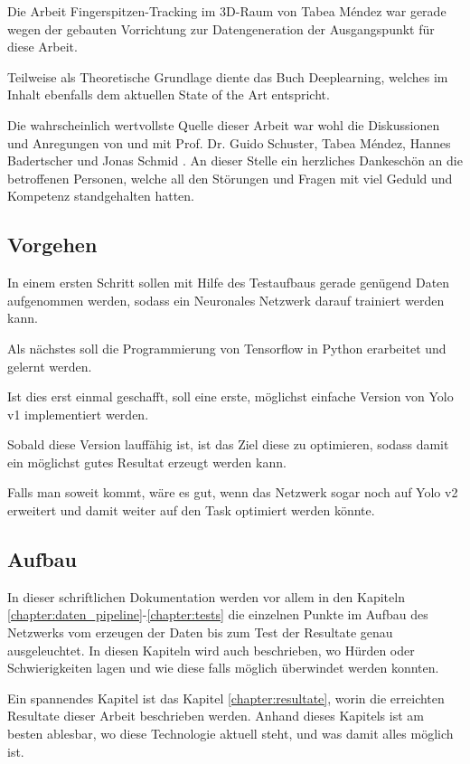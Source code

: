 Die Arbeit \grqq{}Fingerspitzen-Tracking im 3D-Raum\grqq{} von Tabea Méndez \cite{TabeasFingertracking} war gerade wegen der gebauten Vorrichtung zur Datengeneration der Ausgangspunkt für diese Arbeit.

Teilweise als Theoretische Grundlage diente das Buch Deeplearning\cite{deeplearning}, welches im Inhalt ebenfalls dem aktuellen State of the Art entspricht.

Die wahrscheinlich wertvollste Quelle dieser Arbeit war wohl die Diskussionen und Anregungen von und mit Prof. Dr. Guido Schuster, Tabea Méndez, Hannes Badertscher und Jonas Schmid \cite{PrivateCommunication}. An dieser Stelle ein herzliches Dankeschön an die betroffenen Personen, welche all den Störungen und Fragen mit viel Geduld und Kompetenz standgehalten hatten. 

\subsection{Vorgehen}
\label{chapter:vorgehen}
In einem ersten Schritt sollen mit Hilfe des Testaufbaus\cite{TabeasFingertracking} gerade genügend Daten aufgenommen werden, sodass ein Neuronales Netzwerk darauf trainiert werden kann.

Als nächstes soll die Programmierung von Tensorflow in Python erarbeitet und gelernt werden.

Ist dies erst einmal geschafft, soll eine erste, möglichst einfache Version von Yolo v1\cite{yolo} implementiert werden.

Sobald diese Version lauffähig ist, ist das Ziel diese zu optimieren, sodass damit ein möglichst gutes Resultat erzeugt werden kann. 

Falls man soweit kommt, wäre es gut, wenn das Netzwerk sogar noch auf Yolo v2\cite{yolo2} erweitert und damit weiter auf den Task optimiert werden könnte.

\subsection{Aufbau}
In dieser schriftlichen Dokumentation werden vor allem in den Kapiteln \ref{chapter:daten_pipeline}-\ref{chapter:tests} die einzelnen Punkte im Aufbau des Netzwerks vom erzeugen der Daten bis zum Test der Resultate genau ausgeleuchtet.
In diesen Kapiteln wird auch beschrieben, wo Hürden oder Schwierigkeiten lagen und wie diese falls möglich überwindet werden konnten.

Ein spannendes Kapitel ist das Kapitel \ref{chapter:resultate}, worin die erreichten Resultate dieser Arbeit beschrieben werden.
Anhand dieses Kapitels ist am besten ablesbar, wo diese Technologie aktuell steht, und was damit alles möglich ist.

